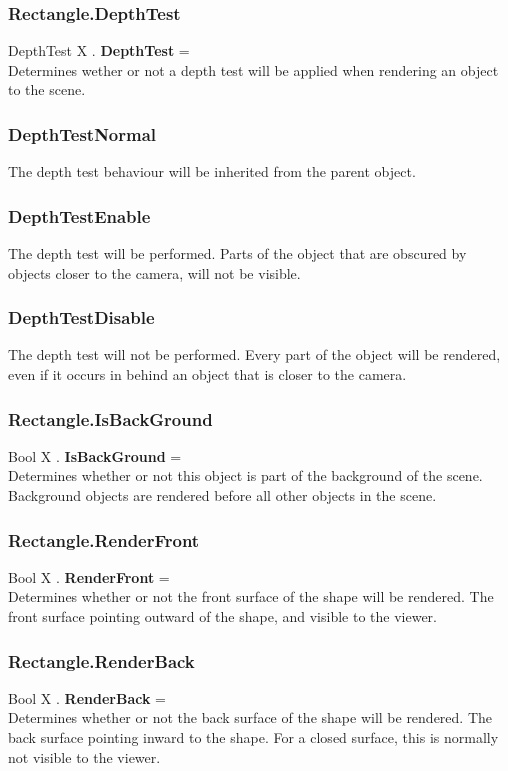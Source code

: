 \subsubsection{Rectangle.DepthTest \label{F:Rectangle:DepthTest}}
DepthTest X . \textbf{DepthTest} = \\
Determines wether or not a depth test will be applied when rendering an object to the scene.

\subsubsection{DepthTestNormal \label{T:DepthTest|DepthTestNormal}}
The depth test behaviour will be inherited from the parent object.

\subsubsection{DepthTestEnable \label{T:DepthTest|DepthTestEnable}}
The depth test will be performed. Parts of the object that are obscured by objects closer to the camera, will not be visible.

\subsubsection{DepthTestDisable \label{T:DepthTest|DepthTestDisable}}
The depth test will not be performed. Every part of the object will be rendered, even if it occurs in behind an object that is closer to the camera.

\subsubsection{Rectangle.IsBackGround \label{F:Rectangle:IsBackGround}}
Bool X . \textbf{IsBackGround} = \\
Determines whether or not this object is part of the background of the scene. Background objects are rendered before all other objects in the scene.

\subsubsection{Rectangle.RenderFront \label{F:Rectangle:RenderFront}}
Bool X . \textbf{RenderFront} = \\
Determines whether or not the front surface of the shape will be rendered. The front surface pointing outward of the shape, and visible to the viewer.

\subsubsection{Rectangle.RenderBack \label{F:Rectangle:RenderBack}}
Bool X . \textbf{RenderBack} = \\
Determines whether or not the back surface of the shape will be rendered. The back surface pointing inward to the shape. For a closed surface, this is normally not visible to the viewer.

